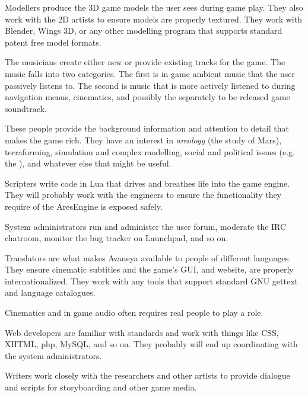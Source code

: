 
Modellers produce the 3D game models the user sees during game play. They also work with the 2D artists to ensure models are properly textured. They work with Blender, Wings 3D, or any other modelling program that supports standard patent free model formats.


The musicians create either new or provide existing tracks for the game. The music falls into two categories. The first is in game ambient music that the user passively listens to. The second is music that is more actively listened to during navigation menus, cinematics, and possibly the separately to be released game soundtrack.


These people provide the background information and attention to detail that makes the game rich. They have an interest in {\it areology} (the study of Mars), terraforming, simulation and complex modelling, social and political issues (e.g. the ), and whatever else that might be useful.


Scripters write code in Lua that drives and breathes life into the game engine. They will probably work with the engineers to ensure the functionality they require of the AresEngine is exposed safely.


System administrators run and administer the user forum, moderate the IRC chatroom, monitor the bug tracker on Launchpad, and so on.


Translators are what makes Avaneya available to people of different languages. They ensure cinematic subtitles and the game's GUI, and website, are properly internationalized. They work with any tools that support standard GNU gettext and language catalogues.


Cinematics and in game audio often requires real people to play a role.


Web developers are familiar with standards and work with things like CSS, XHTML, php, MySQL, and so on. They probably will end up coordinating with the system administrators.


Writers work closely with the researchers and other artists to provide dialogue and scripts for storyboarding and other game media.
\stopitemize

